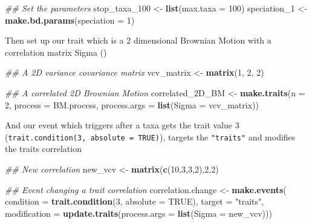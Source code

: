 \documentclass[
]{book}
\newenvironment{Shaded}{\begin{snugshade}}{\end{snugshade}}
\newcommand{\CommentTok}[1]{\textcolor[rgb]{0.56,0.35,0.01}{\textit{#1}}}
\newcommand{\DataTypeTok}[1]{\textcolor[rgb]{0.13,0.29,0.53}{#1}}
\newcommand{\DecValTok}[1]{\textcolor[rgb]{0.00,0.00,0.81}{#1}}
\newcommand{\KeywordTok}[1]{\textcolor[rgb]{0.13,0.29,0.53}{\textbf{#1}}}
\newcommand{\NormalTok}[1]{#1}
\newcommand{\OtherTok}[1]{\textcolor[rgb]{0.56,0.35,0.01}{#1}}
\newcommand{\StringTok}[1]{\textcolor[rgb]{0.31,0.60,0.02}{#1}}
\begin{document}
\begin{Shaded}
\begin{Highlighting}[]
\CommentTok{\#\# Set the parameters}
\NormalTok{stop\_taxa\_}\DecValTok{100}\NormalTok{ \textless{}{-}}\StringTok{ }\KeywordTok{list}\NormalTok{(}\DataTypeTok{max.taxa =} \DecValTok{100}\NormalTok{)}
\NormalTok{speciation\_}\DecValTok{1}\NormalTok{ \textless{}{-}}\StringTok{ }\KeywordTok{make.bd.params}\NormalTok{(}\DataTypeTok{speciation =} \DecValTok{1}\NormalTok{)}
\end{Highlighting}
\end{Shaded}

Then set up our trait which is a 2 dimensional Brownian Motion with a correlation matrix Sigma ()

\begin{Shaded}
\begin{Highlighting}[]
\CommentTok{\#\# A 2D variance covariance matrix}
\NormalTok{vcv\_matrix \textless{}{-}}\StringTok{ }\KeywordTok{matrix}\NormalTok{(}\DecValTok{1}\NormalTok{, }\DecValTok{2}\NormalTok{, }\DecValTok{2}\NormalTok{)}

\CommentTok{\#\# A correlated 2D Brownian Motion}
\NormalTok{correlated\_2D\_BM \textless{}{-}}\StringTok{ }\KeywordTok{make.traits}\NormalTok{(}\DataTypeTok{n =} \DecValTok{2}\NormalTok{, }\DataTypeTok{process =}\NormalTok{ BM.process,}
                      \DataTypeTok{process.args =} \KeywordTok{list}\NormalTok{(}\DataTypeTok{Sigma =}\NormalTok{ vcv\_matrix))}
\end{Highlighting}
\end{Shaded}

And our event which triggers after a taxa gets the trait value 3 (\texttt{trait.condition(3,\ absolute\ =\ TRUE)}), targets the \texttt{"traits"} and modifies the traits correlation

\begin{Shaded}
\begin{Highlighting}[]
\CommentTok{\#\# New correlation}
\NormalTok{new\_vcv \textless{}{-}}\StringTok{ }\KeywordTok{matrix}\NormalTok{(}\KeywordTok{c}\NormalTok{(}\DecValTok{10}\NormalTok{,}\DecValTok{3}\NormalTok{,}\DecValTok{3}\NormalTok{,}\DecValTok{2}\NormalTok{),}\DecValTok{2}\NormalTok{,}\DecValTok{2}\NormalTok{)}

\CommentTok{\#\# Event changing a trait correlation}
\NormalTok{correlation.change \textless{}{-}}\StringTok{ }\KeywordTok{make.events}\NormalTok{(}
    \DataTypeTok{condition    =} \KeywordTok{trait.condition}\NormalTok{(}\DecValTok{3}\NormalTok{, }\DataTypeTok{absolute =} \OtherTok{TRUE}\NormalTok{),}
    \DataTypeTok{target       =} \StringTok{"traits"}\NormalTok{,}
    \DataTypeTok{modification =} \KeywordTok{update.traits}\NormalTok{(}\DataTypeTok{process.args =} \KeywordTok{list}\NormalTok{(}\DataTypeTok{Sigma =}\NormalTok{ new\_vcv)))}
\end{Highlighting}
\end{Shaded}
\end{document}
